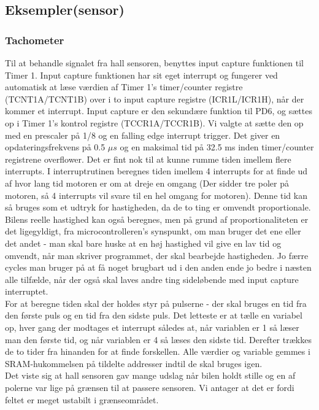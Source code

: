 \subsection{Eksempler(sensor)}

\subsubsection{Tachometer}

Til at behandle signalet fra hall sensoren, benyttes input capture funktionen til Timer 1. Input capture funktionen har sit eget interrupt og fungerer ved automatisk at læse værdien af Timer 1's timer/counter registre (TCNT1A/TCNT1B) over i to input capture registre (ICR1L/ICR1H), når der kommer et interrupt. Input capture er den sekundære funktion til PD6, og sættes op i Timer 1's kontrol registre (TCCR1A/TCCR1B). Vi valgte at sætte den op med en prescaler på 1/8 og en falling edge interrupt trigger. Det giver en opdateringsfrekvens på 0.5 $\mu s$ og en maksimal tid på 32.5 ms inden timer/counter registrene overflower. Det er fint nok til at kunne rumme tiden imellem flere interrupts. I interruptrutinen beregnes tiden imellem 4 interrupts for at finde ud af hvor lang tid motoren er om at dreje en omgang (Der sidder tre poler på motoren, så 4 interrupts vil svare til en hel omgang for motoren). Denne tid kan så bruges som et udtryk for hastigheden, da de to ting er omvendt proportionale. Bilens reelle hastighed kan også beregnes, men på grund af proportionaliteten er det ligegyldigt, fra microcontrolleren's synspunkt, om man bruger det ene eller det andet - man skal bare huske at en høj hastighed vil give en lav tid og omvendt, når man skriver programmet, der skal bearbejde hastigheden. Jo færre cycles man bruger på at få noget brugbart ud i den anden ende jo bedre i næsten alle tilfælde, når der også skal laves andre ting sideløbende med input capture interruptet.\\
For at beregne tiden skal der holdes styr på pulserne - der skal bruges en tid fra den første puls og en tid fra den sidste puls. Det letteste er at tælle en variabel op, hver gang der modtages et interrupt således at, når variablen er 1 så læser man den første tid, og når variablen er 4 så læses den sidste tid. Derefter trækkes de to tider fra hinanden for at finde forskellen. Alle værdier og variable gemmes i SRAM-hukommelsen på tildelte addresser indtil de skal bruges igen.\\

Det viste sig at hall sensoren gav mange udslag når bilen holdt stille og en af polerne var lige på grænsen til at passere sensoren. Vi antager at det er fordi feltet er meget ustabilt i grænseområdet. 


